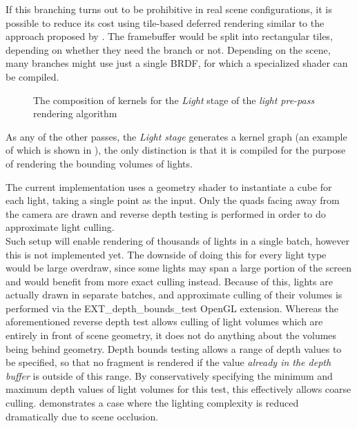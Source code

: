 If this branching turns out to be prohibitive in real scene configurations, it is possible to reduce its cost using tile-based deferred rendering similar to the approach proposed by \citet{tiledDeferred}. The framebuffer would be split into rectangular tiles, depending on whether they need the branch or not. Depending on the scene, many branches might use just a single BRDF, for which a specialized shader can be compiled.

\begin{figure}[ht!]
  \centering
    \caption[Light Pre-Pass Stage 2]{The composition of kernels for the \emph{Light} stage of the  \emph{light pre-pass} rendering algorithm}
  \label{fig:DeferredLightingStage2}
\end{figure}

As any of the other passes, the \emph{Light stage} generates a kernel graph (an example of which is shown in ), the only distinction is that it is compiled for the purpose of rendering the bounding volumes of lights.

The current implementation uses a geometry shader to instantiate a cube for each light, taking a single point as the input. Only the quads facing away from the camera are drawn and reverse depth testing is performed in order to do approximate light culling. \\
Such setup will enable rendering of thousands of lights in a single batch, however this is not implemented yet. The downside of doing this for every light type would be large overdraw, since some lights may span a large portion of the screen and would benefit from more exact culling instead. Because of this, lights are actually drawn in separate batches, and approximate culling of their volumes is performed via the EXT\_depth\_bounds\_test OpenGL extension. Whereas the aforementioned reverse depth test allows culling of light volumes which are entirely in front of scene geometry, it does not do anything about the volumes being behind geometry. Depth bounds testing allows a range of depth values to be specified, so that no fragment is rendered if the value \emph{already in the depth buffer} is outside of this range. By conservatively specifying the minimum and maximum depth values of light volumes for this test, this effectively allows coarse culling.  demonstrates a case where the lighting complexity is reduced dramatically due to scene occlusion.

